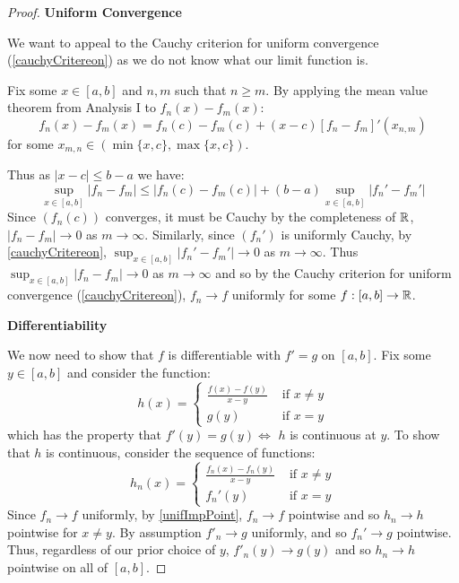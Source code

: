 \documentclass[../main.tex]{subfiles}
\begin{document}
\begin{proof}\par
  \textbf{Uniform Convergence}\par
  We want to appeal to the Cauchy criterion for uniform convergence (\cref{cauchyCritereon}) as we do not know what our limit function is.

  Fix some $x \in [a, b]$ and $n, m$ such that $n \geq m$.
  By applying the mean value theorem from Analysis I to $f_n(x) - f_m(x)$:
  \[
    f_n(x) - f_m(x) = f_n(c) - f_m(c) + (x - c)[f_n - f_m]'(x_{n, m})
  \]
  for some $x_{m, n} \in (\min\{x, c\}, \max\{x, c\})$.

  Thus as $|x - c| \leq b - a$ we have:
  \[
    \sup_{x \in [a, b]} |f_n - f_m| \leq |f_n(c) - f_m(c)| + (b - a) \sup_{x \in [a, b]} |f_n' - f_m'|
  \]
  Since $(f_n(c))$ converges, it must be Cauchy by the completeness of $\mathbb{R}$, $|f_n - f_m| \to 0$ as $m \to \infty$.
  Similarly, since $(f_n')$ is uniformly Cauchy, by \cref{cauchyCritereon}, $\sup_{x \in [a, b]} |f_n' - f_m'| \to 0$ as $m \to \infty$.
  Thus $\sup_{x \in [a, b]} |f_n - f_m| \to 0$ as $m \to \infty$ and so by the Cauchy criterion for uniform convergence (\cref{cauchyCritereon}), $f_n \to f$ uniformly for some $f: [a, b] \to \mathbb{R}$.

  \textbf{Differentiability}\par
  We now need to show that $f$ is differentiable with $f' = g$ on $[a, b]$.
  Fix some $y \in [a, b]$ and consider the function:
  \[
    h(x) = \begin{cases}
    \frac{f(x) - f(y)}{x - y} & \text{ if } x \neq y \\
    g(y) & \text{ if } x = y
    \end{cases}
  \]
  which has the property that $f'(y) = g(y) \iff$ $h$ is continuous at $y$.
  To show that $h$ is continuous, consider the sequence of functions:
  \[
    h_n(x) = \begin{cases}
    \frac{f_n(x) - f_n(y)}{x - y} & \text{ if } x \neq y \\
    f_n'(y) & \text{ if } x = y
    \end{cases}
  \]
  Since $f_n \to f$ uniformly, by \cref{unifImpPoint}, $f_n \to f$ pointwise and so $h_n \to h$ pointwise for $x \neq y$.
  By assumption $f'_n \to g$ uniformly, and so $f_n' \to g$ pointwise.
  Thus, regardless of our prior choice of $y$, $f'_n(y) \to g(y)$ and so $h_n \to h$ pointwise on all of $[a, b]$.


\end{proof}
\end{document}
